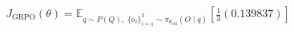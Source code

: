 \documentclass[preview]{standalone}
\begin{document}
\begin{align*}
J_{\text{GRPO}}(\theta) =  \mathbb{E}_{ q \sim P(Q) ,\;  \{o_i\}_{i=1}^3 \sim \pi_{\theta_{\text{old}}}(O \mid q)} \left[ \frac{1}{3} \left(0.139837\right) \right]
\end{align*}
\end{document}
